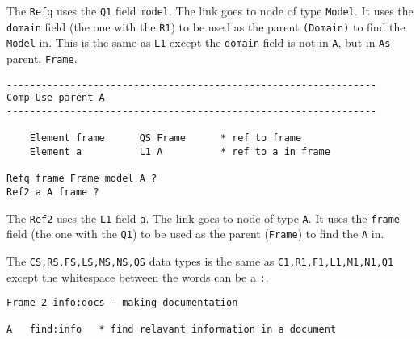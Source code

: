 The \texttt{Refq} uses the \texttt{Q1} field \texttt{model}. The link
goes to node of type \texttt{Model}. It uses the \texttt{domain} field
(the one with the \texttt{R1}) to be used as the parent
\texttt{(Domain)} to find the \texttt{Model} in. This is the same as
\texttt{L1} except the \texttt{domain} field is not in \texttt{A}, but
in \texttt{A\textquotesingle{}s} parent, \texttt{Frame}.

\begin{verbatim}
----------------------------------------------------------------
Comp Use parent A
----------------------------------------------------------------

    Element frame      QS Frame      * ref to frame
    Element a          L1 A          * ref to a in frame

Refq frame Frame model A ?
Ref2 a A frame ?
\end{verbatim}

The \texttt{Ref2} uses the \texttt{L1} field \texttt{a}. The link goes
to node of type \texttt{A}. It uses the \texttt{frame} field (the one
with the \texttt{Q1}) to be used as the parent (\texttt{Frame}) to find
the \texttt{A} in.

The \texttt{CS,RS,FS,LS,MS,NS,QS} data types is the same as
\texttt{C1,R1,F1,L1,M1,N1,Q1} except the whitespace between the words
can be a \texttt{:}.

\begin{verbatim}
Frame 2 info:docs - making documentation

A   find:info   * find relavant information in a document
\end{verbatim}
